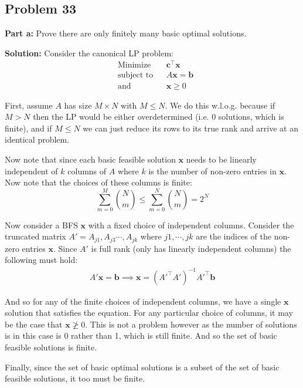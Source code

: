 \documentclass{article}
\renewcommand\vec{\mathbf}
\begin{document}
\subsection*{Problem 33}
\noindent\textbf{Part a:} Prove there are only finitely many basic optimal solutions.
\bigskip

\noindent\textbf{Solution:} Consider the canonical LP problem:
$$\begin{aligned}
    &{\text{Minimize}}
    &&\vec c^\top\vec x\\
    &{\text{subject to}}
    &&A\vec x=\vec b\\
    &{\text{and}}
    &&\vec x\ge 0
\end{aligned}$$

First, assume $A$ has size $M\times N$ with $M\le N$. We do this w.l.o.g. because if $M>N$ then the LP would be either overdetermined (i.e. 0 solutions, which is finite), and if $M\le N$ we can just reduce its rows to its true rank and arrive at an identical problem.

Now note that since each basic feasible solution $\vec x$ needs to be linearly independent of $k$ columns of $A$ where $k$ is the number of non-zero entries in $\vec x$. Now note that the choices of these columns is finite:
\begin{equation*}
    \sum_{m=0}^M\binom{N}{m}\le\sum_{m=0}^N\binom{N}{m}=2^N
\end{equation*}

Now consider a BFS $\vec x$ with a fixed choice of independent columns. Consider the truncated matrix $A'=A_{j1},A_{j3}\cdots,A_{jk}$ where $j1,\cdots,jk$ are the indices of the non-zero entries $\vec x$. Since $A'$ is full rank (only has linearly independent columns) the following must hold:
\begin{align*}
    A'\vec x=\vec b\implies \vec x=(A'^\top A')^{-1}A'^\top\vec b
\end{align*}

And so for any of the finite choices of independent columns, we have a single $\vec x$ solution that satisfies the equation. For any particular choice of columns, it may be the case that $\vec x\not\ge 0$. This is not a problem however as the number of solutions is in this case is 0 rather than 1, which is still finite. And so the set of basic feasible solutions is finite.

Finally, since the set of basic optimal solutions is a subset of the set of basic feasible solutions, it too must be finite.
\bigskip
\end{document}
